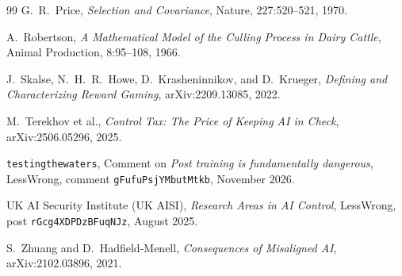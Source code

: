 \documentclass[11pt,a4paper]{article}
\begin{document}
\begin{thebibliography}{99}
G.~R.~Price,
\emph{Selection and Covariance},
Nature, 227:520--521, 1970.

A.~Robertson,
\emph{A Mathematical Model of the Culling Process in Dairy Cattle},
Animal Production, 8:95--108, 1966.

J.~Skalse, N.~H.~R.~Howe, D.~Krasheninnikov, and D.~Krueger,
\emph{Defining and Characterizing Reward Gaming},
arXiv:2209.13085, 2022.

M.~Terekhov et al.,
\emph{Control Tax: The Price of Keeping AI in Check},
arXiv:2506.05296, 2025.

\texttt{testingthewaters},
Comment on \emph{Post training is fundamentally dangerous},
LessWrong, comment \texttt{gFufuPsjYMbutMtkb}, November 2026.

UK AI Security Institute (UK AISI),
\emph{Research Areas in AI Control},
LessWrong, post \texttt{rGcg4XDPDzBFuqNJz}, August 2025.

S.~Zhuang and D.~Hadfield-Menell,
\emph{Consequences of Misaligned AI},
arXiv:2102.03896, 2021.

\end{thebibliography}
\end{document}
